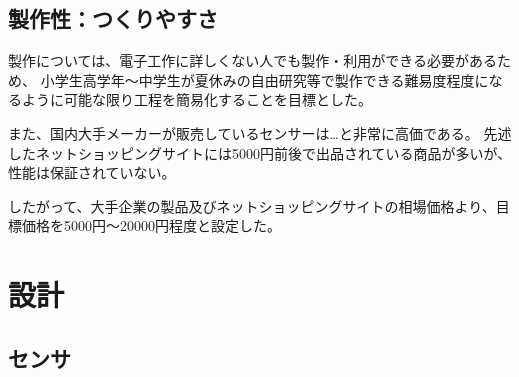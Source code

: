\documentclass[a4paper]{jsarticle}
\begin{document}
\subsection{製作性：つくりやすさ}
製作については、電子工作に詳しくない人でも製作・利用ができる必要があるため、
小学生高学年～中学生が夏休みの自由研究等で製作できる難易度程度になるように可能な限り工程を簡易化することを目標とした。\par
また、国内大手メーカーが販売しているセンサーは…と非常に高価である。
先述したネットショッピングサイトには5000円前後で出品されている商品が多いが、性能は保証されていない。\par
したがって、大手企業の製品及びネットショッピングサイトの相場価格より、目標価格を5000円～20000円程度と設定した。
\section{設計}
\subsection{センサ}
\end{document}
